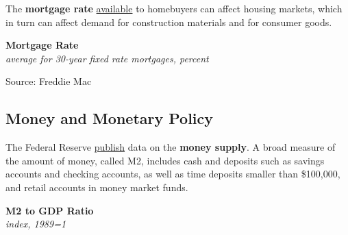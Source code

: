 \documentclass{report}
\makeatletter
\newcommand{\tbllink}[1]{\href{https://raw.githubusercontent.com/bdecon/US-chartbook/master/chartbook/data/#1}{\faTable}}
\newcommand*\short[1]{\expandafter\@gobbletwo\number\numexpr#1\relax}
\newcommand{\dateaxisticks}{
		date coordinates in=x, axis line style={draw=none},
		xmax={2024-01-31},
		max space between ticks=40,	    
		xtick={{1990-01-01}, {1992-01-01}, {1994-01-01}, 
			{1996-01-01}, {1998-01-01}, {2000-01-01}, 
			{2002-01-01}, {2004-01-01}, {2006-01-01},
			{2008-01-01}, {2010-01-01}, {2012-01-01}, {2014-01-01},
		    {2016-01-01}, {2018-01-01}, {2020-01-01}, {2022-01-01}, 
		    {2024-01-01}, {2026-01-01}},
		minor xtick={{1989-01-01}, {1991-01-01}, {1993-01-01},
			{1995-01-01}, {1997-01-01}, {1999-01-01}, 
			{2001-01-01}, {2003-01-01}, {2005-01-01}, {2007-01-01},
		    {2009-01-01}, {2011-01-01}, {2013-01-01}, {2015-01-01},
		    {2017-01-01}, {2019-01-01}, {2021-01-01}, {2023-01-01}, 
		    {2025-01-01}, {2027-01-01}},
		enlarge y limits={0.06}, enlarge x limits={0.01},
		xticklabel style={align=center, yshift=-2pt}, tick label style={inner sep=0pt},
		}
\newcommand{\shdateaxisticks}{
		date coordinates in=x, axis line style={draw=none},
		xmax={2024-01-31},
		max space between ticks=40,	    
		xtick={{1990-01-01}, {1995-01-01}, {2000-01-01}, 
			{2005-01-01}, {2010-01-01}, {2015-01-01}, {2020-01-01}},
		minor xtick={},
		enlarge y limits={0.06}, enlarge x limits={0.01},
		xticklabel style={align=center, yshift=-2pt}, tick label style={inner sep=0pt},
		}
\newcommand{\bbar}[2]{extra #1 ticks = {{#2}}, extra #1 tick labels = ,
		extra #1 tick style = {grid=major, grid style={thick, black!25}},}
\newcommand{\stdline}[4]{\addplot[very thick, no markers, color=#1] 
		table [x=#2, y=#3, col sep=comma] {#4};	}
\newcommand{\thickline}[4]{\addplot[ultra thick, no markers, color=#1] 
		table [x=#2, y=#3, col sep=comma] {#4};	}
\newcommand{\rbars}{
		\fill[color=black!10] (axis cs:{1990-07-01},\pgfkeysvalueof{/pgfplots/ymin})
			rectangle (axis cs:{1991-03-01}, \pgfkeysvalueof{/pgfplots/ymax});
		\fill[color=black!10] (axis cs:{2007-12-01},\pgfkeysvalueof{/pgfplots/ymin})
			rectangle (axis cs:{2009-07-01}, \pgfkeysvalueof{/pgfplots/ymax});
		\fill[color=black!10] (axis cs:{2001-03-01},\pgfkeysvalueof{/pgfplots/ymin})
			rectangle (axis cs:{2001-11-01}, \pgfkeysvalueof{/pgfplots/ymax});
		\fill[color=black!10] (axis cs:{2020-02-01},\pgfkeysvalueof{/pgfplots/ymin})
			rectangle (axis cs:{2020-05-01}, \pgfkeysvalueof{/pgfplots/ymax});}
\makeatother
\begin{document}
{\begin{minipage}{1.0\textwidth}
\small The \textbf{mortgage rate} \href{https://www.freddiemac.com/pmms/pmms30}{available} to homebuyers can affect housing markets, which in turn can affect demand for construction materials and for consumer goods.  
\vspace{0.5mm} 

\normalsize \textbf{Mortgage Rate}\\
\footnotesize{\textit{average for 30-year fixed rate mortgages, percent}}
\vspace{3.1cm}

\hspace{2mm} 

\footnotesize{Source: Freddie Mac} \hfill \tbllink{mortgage_mo.csv}
\end{minipage}
\newpage
\hypertarget{capmm}{\label{capmm}}
\begin{minipage}{1.0\textwidth}
\subsection*{Money and Monetary Policy}  
\small The Federal Reserve \href{https://www.federalreserve.gov/releases/h6/current/default.htm}{publish} data on the \textbf{money supply}. A broad measure of the amount of money, called M2, includes cash and deposits such as savings accounts and checking accounts, as well as time deposits smaller than \$100,000, and retail accounts in money market funds. 

\begin{minipage}{0.52\textwidth}

\end{minipage} \hfill \begin{minipage}{0.42\textwidth}
\normalsize \textbf{M2 to GDP Ratio}\\
\footnotesize{\textit{index, 1989=1}}
\vspace{2.0cm}

\hspace{3mm} 


\end{minipage}
\end{minipage}}
\end{document}
